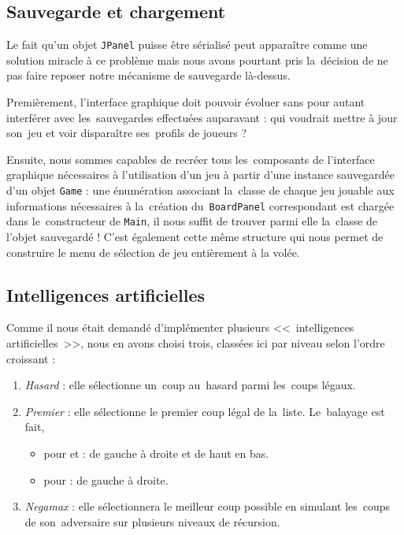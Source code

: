 \subsection{Sauvegarde et chargement}
Le fait qu'un objet \texttt{JPanel} puisse être sérialisé peut apparaître comme une solution miracle à ce problème 
mais nous avons pourtant pris la~décision de ne pas faire reposer notre mécanisme de sauvegarde là-dessus.

Premièrement, l'interface graphique doit pouvoir évoluer sans pour autant interférer avec les~sauvegardes effectuées auparavant : 
qui voudrait mettre à jour son~jeu et voir disparaître ses~profils de joueurs ?

Ensuite, nous sommes capables de recréer tous les~composants de l'interface graphique nécessaires à l'utilisation d'un jeu 
à partir d'une instance sauvegardée d'un objet \texttt{Game} : une énumération associant la~classe de chaque jeu jouable 
aux informations nécessaires à la~création du~\texttt{BoardPanel} correspondant est chargée dans le~constructeur de \texttt{Main}, 
il nous suffit de trouver parmi elle la~classe de l'objet sauvegardé ! C'est également cette même structure 
qui nous permet de construire le menu de sélection de jeu entièrement à la volée.


\subsection{Intelligences artificielles}
Comme il nous était demandé d'implémenter plusieurs <<~intelligences artificielles~>>, 
nous en avons choisi trois, classées ici par niveau selon l'ordre croissant :

\begin{enumerate}
	\item \emph{Hasard} : elle sélectionne un~coup au~hasard parmi les~coups légaux.
    \item \emph{Premier} : elle sélectionne le premier coup légal de la~liste. Le~balayage est fait,
    \begin{itemize}
        \item pour \oth{} et \ttt{} : de gauche à droite et de haut en bas.
        \item pour \cf{} : de gauche à droite.
    \end{itemize}
    \item \emph{Negamax} : elle sélectionnera le meilleur coup possible en simulant les~coups de son~adversaire sur plusieurs niveaux de récursion.
\end{enumerate}